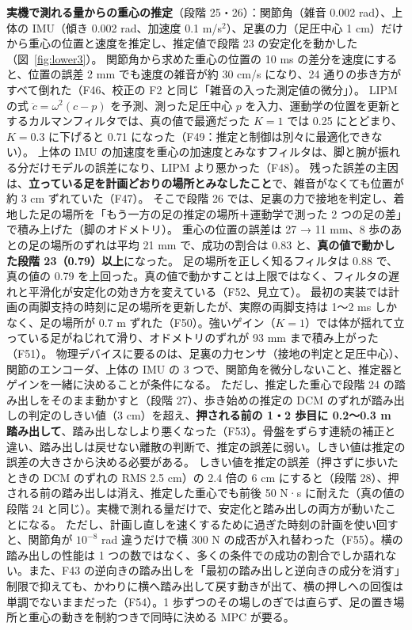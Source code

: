 \documentclass[paper=a4paper,fontsize=10pt,twocolumn,column_gap=2zw,line_length=24zw,number_of_lines=46,head_space=20mm]{jlreq}
\begin{document}
\textbf{実機で測れる量からの重心の推定}（段階 25・26）：関節角（雑音 0.002 rad）、上体の IMU（傾き 0.002 rad、加速度 0.1 m/s$^2$）、足裏の力（足圧中心 1 cm）だけから重心の位置と速度を推定し、推定値で段階 23 の安定化を動かした（図~\ref{fig:lower3}）。
関節角から求めた重心の位置の 10 ms の差分を速度にすると、位置の誤差 2 mm でも速度の雑音が約 30 cm/s になり、24 通りの歩き方がすべて倒れた（F46、校正の F2 と同じ「雑音の入った測定値の微分」）。
LIPM の式 $\ddot c=\omega^2(c-p)$ を予測、測った足圧中心 $p$ を入力、運動学の位置を更新とするカルマンフィルタでは、真の値で最適だった $K=1$ では 0.25 にとどまり、$K=0.3$ に下げると 0.71 になった（F49：推定と制御は別々に最適化できない）。
上体の IMU の加速度を重心の加速度とみなすフィルタは、脚と腕が振れる分だけモデルの誤差になり、LIPM より悪かった（F48）。
残った誤差の主因は、\textbf{立っている足を計画どおりの場所とみなしたこと}で、雑音がなくても位置が約 3 cm ずれていた（F47）。
そこで段階 26 では、足裏の力で接地を判定し、着地した足の場所を「もう一方の足の推定の場所＋運動学で測った 2 つの足の差」で積み上げた（脚のオドメトリ）。
重心の位置の誤差は 27 → 11 mm、8 歩のあとの足の場所のずれは平均 21 mm で、成功の割合は 0.83 と、\textbf{真の値で動かした段階 23（0.79）以上}になった。
足の場所を正しく知るフィルタは 0.88 で、真の値の 0.79 を上回った。真の値で動かすことは上限ではなく、フィルタの遅れと平滑化が安定化の効き方を変えている（F52、見立て）。
最初の実装では計画の両脚支持の時刻に足の場所を更新したが、実際の両脚支持は 1〜2 ms しかなく、足の場所が 0.7 m ずれた（F50）。強いゲイン（$K=1$）では体が揺れて立っている足がねじれて滑り、オドメトリのずれが 93 mm まで積み上がった（F51）。
物理デバイスに要るのは、足裏の力センサ（接地の判定と足圧中心）、関節のエンコーダ、上体の IMU の 3 つで、関節角を微分しないこと、推定器とゲインを一緒に決めることが条件になる。
ただし、推定した重心で段階 24 の踏み出しをそのまま動かすと（段階 27）、歩き始めの推定の DCM のずれが踏み出しの判定のしきい値（3 cm）を超え、\textbf{押される前の 1・2 歩目に 0.2〜0.3 m 踏み出して}、踏み出しなしより悪くなった（F53）。骨盤をずらす連続の補正と違い、踏み出しは戻せない離散の判断で、推定の誤差に弱い。しきい値は推定の誤差の大きさから決める必要がある。
しきい値を推定の誤差（押さずに歩いたときの DCM のずれの RMS 2.5 cm）の 2.4 倍の 6 cm にすると（段階 28）、押される前の踏み出しは消え、推定した重心でも前後 50 N·s に耐えた（真の値の段階 24 と同じ）。実機で測れる量だけで、安定化と踏み出しの両方が動いたことになる。
ただし、計画し直しを速くするために過ぎた時刻の計画を使い回すと、関節角が $10^{-8}$ rad 違うだけで横 300 N の成否が入れ替わった（F55）。横の踏み出しの性能は 1 つの数ではなく、多くの条件での成功の割合でしか語れない。また、F43 の逆向きの踏み出しを「最初の踏み出しと逆向きの成分を消す」制限で抑えても、かわりに横へ踏み出して戻す動きが出て、横の押しへの回復は単調でないままだった（F54）。1 歩ずつのその場しのぎでは直らず、足の置き場所と重心の動きを制約つきで同時に決める MPC が要る。
\end{document}
